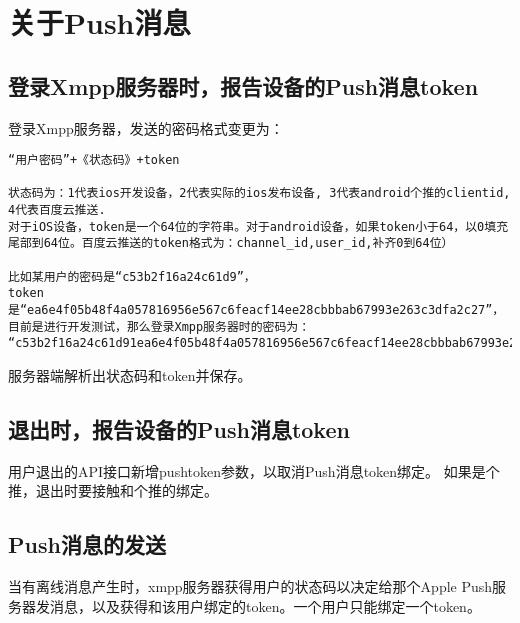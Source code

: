 


\section{关于Push消息}

\subsection{登录Xmpp服务器时，报告设备的Push消息token}
登录Xmpp服务器，发送的密码格式变更为：

\begin{verbatim}
“用户密码”+《状态码》+token

状态码为：1代表ios开发设备，2代表实际的ios发布设备, 3代表android个推的clientid, 4代表百度云推送.
对于iOS设备，token是一个64位的字符串。对于android设备，如果token小于64，以0填充尾部到64位。百度云推送的token格式为：channel_id,user_id,补齐0到64位）

比如某用户的密码是“c53b2f16a24c61d9”，
token是“ea6e4f05b48f4a057816956e567c6feacf14ee28cbbbab67993e263c3dfa2c27”，
目前是进行开发测试，那么登录Xmpp服务器时的密码为：
“c53b2f16a24c61d91ea6e4f05b48f4a057816956e567c6feacf14ee28cbbbab67993e263c3dfa2c27”。
\end{verbatim}

服务器端解析出状态码和token并保存。


\subsection{退出时，报告设备的Push消息token}

用户退出的API接口新增pushtoken参数，以取消Push消息token绑定。
如果是个推，退出时要接触和个推的绑定。

\subsection{Push消息的发送}
当有离线消息产生时，xmpp服务器获得用户的状态码以决定给那个Apple Push服务器发消息，以及获得和该用户绑定的token。一个用户只能绑定一个token。

